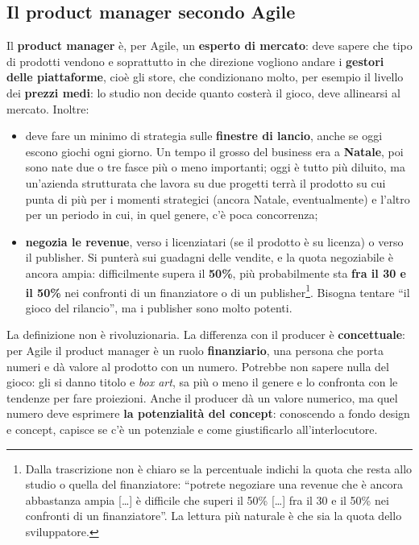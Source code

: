 \subsection{Il product manager secondo Agile}

Il \textbf{product manager} è, per Agile, un \textbf{esperto di mercato}: deve
sapere che tipo di prodotti vendono e soprattutto in che direzione vogliono
andare i \textbf{gestori delle piattaforme}, cioè gli store, che condizionano
molto, per esempio il livello dei \textbf{prezzi medi}: lo studio non decide
quanto costerà il gioco, deve allinearsi al mercato. Inoltre:
\begin{itemize}
  \item deve fare un minimo di strategia sulle \textbf{finestre di lancio}, anche
        se oggi escono giochi ogni giorno. Un tempo il grosso del business era a
        \textbf{Natale}, poi sono nate due o tre fasce più o meno importanti; oggi
        è tutto più diluito, ma un'azienda strutturata che lavora su due
        progetti terrà il prodotto su cui punta di più per i momenti strategici
        (ancora Natale, eventualmente) e l'altro per un periodo in cui, in quel
        genere, c'è poca concorrenza;
  \item \textbf{negozia le revenue}, verso i licenziatari (se il prodotto è su
        licenza) o verso il publisher. Si punterà sui guadagni delle vendite, e
        la quota negoziabile è ancora ampia: difficilmente supera il
        \textbf{50\%}, più probabilmente sta \textbf{fra il 30 e il 50\%} nei
        confronti di un finanziatore o di un publisher\footnote{Dalla
        trascrizione non è chiaro se la percentuale indichi la quota che resta
        allo studio o quella del finanziatore: ``potrete negoziare una revenue
        che è ancora abbastanza ampia [\dots] è difficile che superi il 50\%
        [\dots] fra il 30 e il 50\% nei confronti di un finanziatore''. La
        lettura più naturale è che sia la quota dello sviluppatore.}. Bisogna
        tentare ``il gioco del rilancio'', ma i publisher sono molto potenti.
\end{itemize}
La definizione non è rivoluzionaria. La differenza con il producer è
\textbf{concettuale}: per Agile il product manager è un ruolo
\textbf{finanziario}, una persona che porta numeri e dà valore al prodotto con un
numero. Potrebbe non sapere nulla del gioco: gli si danno titolo e
\emph{box art}, sa più o meno il genere e lo confronta con le tendenze per fare
proiezioni. Anche il producer dà un valore numerico, ma quel numero deve
esprimere \textbf{la potenzialità del concept}: conoscendo a fondo design e
concept, capisce se c'è un potenziale e come giustificarlo all'interlocutore.

